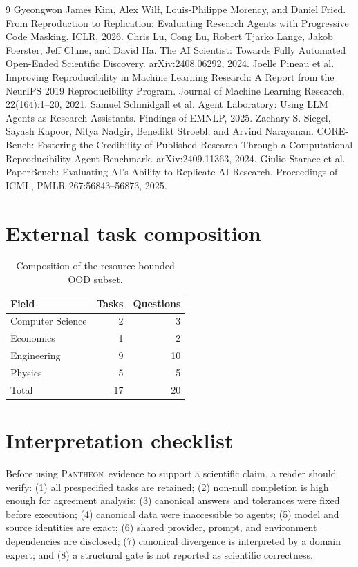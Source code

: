 \documentclass[10pt]{article}
\newcommand{\pantheon}{\textsc{Pantheon}}
\begin{document}
\begin{thebibliography}{9}
 Gyeongwon James Kim, Alex Wilf, Louis-Philippe Morency, and Daniel Fried. From Reproduction to Replication: Evaluating Research Agents with Progressive Code Masking. ICLR, 2026.
 Chris Lu, Cong Lu, Robert Tjarko Lange, Jakob Foerster, Jeff Clune, and David Ha. The AI Scientist: Towards Fully Automated Open-Ended Scientific Discovery. arXiv:2408.06292, 2024.
 Joelle Pineau et al. Improving Reproducibility in Machine Learning Research: A Report from the NeurIPS 2019 Reproducibility Program. Journal of Machine Learning Research, 22(164):1--20, 2021.
 Samuel Schmidgall et al. Agent Laboratory: Using LLM Agents as Research Assistants. Findings of EMNLP, 2025.
 Zachary S. Siegel, Sayash Kapoor, Nitya Nadgir, Benedikt Stroebl, and Arvind Narayanan. CORE-Bench: Fostering the Credibility of Published Research Through a Computational Reproducibility Agent Benchmark. arXiv:2409.11363, 2024.
 Giulio Starace et al. PaperBench: Evaluating AI's Ability to Replicate AI Research. Proceedings of ICML, PMLR 267:56843--56873, 2025.
\end{thebibliography}

\appendix
\section{External task composition}
\begin{table}[h]
\centering
\begin{tabular}{lrr}
\toprule
Field & Tasks & Questions \\
\midrule
Computer Science & 2 & 3 \\
Economics & 1 & 2 \\
Engineering & 9 & 10 \\
Physics & 5 & 5 \\
\midrule
Total & 17 & 20 \\
\bottomrule
\end{tabular}
\caption{Composition of the resource-bounded OOD subset.}
\end{table}

\section{Interpretation checklist}
Before using \pantheon\ evidence to support a scientific claim, a reader should verify: (1) all prespecified tasks are retained; (2) non-null completion is high enough for agreement analysis; (3) canonical answers and tolerances were fixed before execution; (4) canonical data were inaccessible to agents; (5) model and source identities are exact; (6) shared provider, prompt, and environment dependencies are disclosed; (7) canonical divergence is interpreted by a domain expert; and (8) a structural gate is not reported as scientific correctness.
\end{document}
